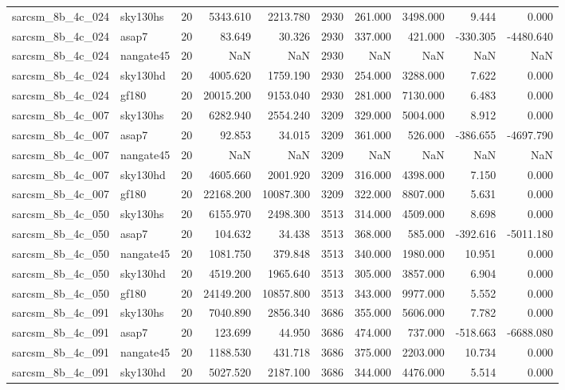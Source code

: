 \begin{longtable}{llrrrrrrrr}
sarcsm\_8b\_4c\_024 & sky130hs & 20 & 5343.610 & 2213.780 & 2930 & 261.000 & 3498.000 & 9.444 & 0.000 \\
sarcsm\_8b\_4c\_024 & asap7 & 20 & 83.649 & 30.326 & 2930 & 337.000 & 421.000 & -330.305 & -4480.640 \\
sarcsm\_8b\_4c\_024 & nangate45 & 20 & NaN & NaN & 2930 & NaN & NaN & NaN & NaN \\
sarcsm\_8b\_4c\_024 & sky130hd & 20 & 4005.620 & 1759.190 & 2930 & 254.000 & 3288.000 & 7.622 & 0.000 \\
sarcsm\_8b\_4c\_024 & gf180 & 20 & 20015.200 & 9153.040 & 2930 & 281.000 & 7130.000 & 6.483 & 0.000 \\
sarcsm\_8b\_4c\_007 & sky130hs & 20 & 6282.940 & 2554.240 & 3209 & 329.000 & 5004.000 & 8.912 & 0.000 \\
sarcsm\_8b\_4c\_007 & asap7 & 20 & 92.853 & 34.015 & 3209 & 361.000 & 526.000 & -386.655 & -4697.790 \\
sarcsm\_8b\_4c\_007 & nangate45 & 20 & NaN & NaN & 3209 & NaN & NaN & NaN & NaN \\
sarcsm\_8b\_4c\_007 & sky130hd & 20 & 4605.660 & 2001.920 & 3209 & 316.000 & 4398.000 & 7.150 & 0.000 \\
sarcsm\_8b\_4c\_007 & gf180 & 20 & 22168.200 & 10087.300 & 3209 & 322.000 & 8807.000 & 5.631 & 0.000 \\
sarcsm\_8b\_4c\_050 & sky130hs & 20 & 6155.970 & 2498.300 & 3513 & 314.000 & 4509.000 & 8.698 & 0.000 \\
sarcsm\_8b\_4c\_050 & asap7 & 20 & 104.632 & 34.438 & 3513 & 368.000 & 585.000 & -392.616 & -5011.180 \\
sarcsm\_8b\_4c\_050 & nangate45 & 20 & 1081.750 & 379.848 & 3513 & 340.000 & 1980.000 & 10.951 & 0.000 \\
sarcsm\_8b\_4c\_050 & sky130hd & 20 & 4519.200 & 1965.640 & 3513 & 305.000 & 3857.000 & 6.904 & 0.000 \\
sarcsm\_8b\_4c\_050 & gf180 & 20 & 24149.200 & 10857.800 & 3513 & 343.000 & 9977.000 & 5.552 & 0.000 \\
sarcsm\_8b\_4c\_091 & sky130hs & 20 & 7040.890 & 2856.340 & 3686 & 355.000 & 5606.000 & 7.782 & 0.000 \\
sarcsm\_8b\_4c\_091 & asap7 & 20 & 123.699 & 44.950 & 3686 & 474.000 & 737.000 & -518.663 & -6688.080 \\
sarcsm\_8b\_4c\_091 & nangate45 & 20 & 1188.530 & 431.718 & 3686 & 375.000 & 2203.000 & 10.734 & 0.000 \\
sarcsm\_8b\_4c\_091 & sky130hd & 20 & 5027.520 & 2187.100 & 3686 & 344.000 & 4476.000 & 5.514 & 0.000 \\

\end{longtable}
